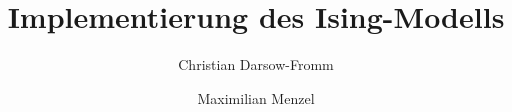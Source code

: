 \documentclass[%
]
{scrartcl}
\begin{document}



\title{Implementierung des Ising-Modells}
\author{Christian Darsow-Fromm
\and{Maximilian Menzel}}


\maketitle 						%



\tableofcontents			%

\setlength{\tabcolsep}{10pt}
\renewcommand{\arraystretch}{2}





\end{document}
